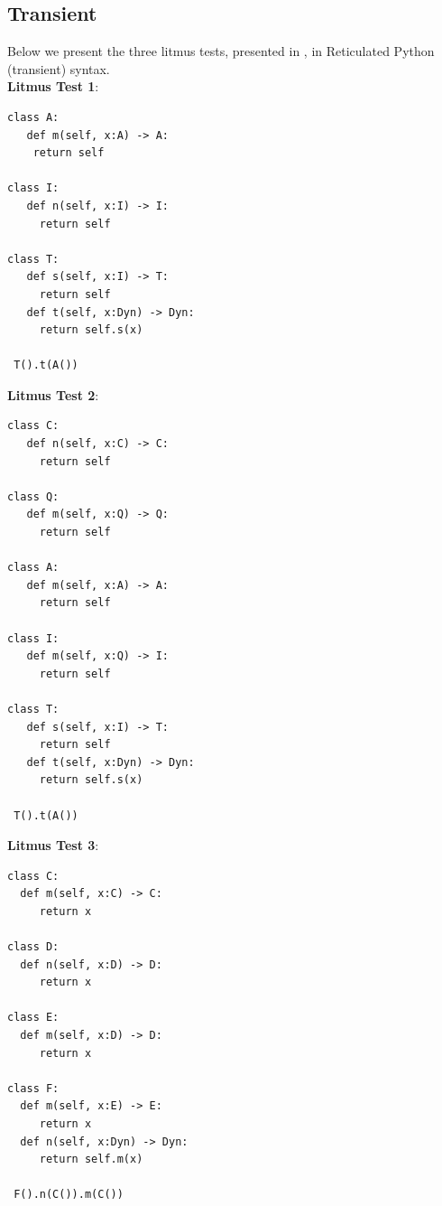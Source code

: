 \documentclass[acmlarge, anonymous, authordraft, review]{acmart} %
\begin{document}
\subsection*{Transient}

Below we present the three litmus tests, presented in , in Reticulated Python (transient) syntax. \\

\noindent
\textbf{Litmus Test 1}:
\begin{lstlisting}
class A:
   def m(self, x:A) -> A:
    return self
    
class I:
   def n(self, x:I) -> I:
     return self

class T:
   def s(self, x:I) -> T:
     return self
   def t(self, x:Dyn) -> Dyn:
     return self.s(x)

 T().t(A())
\end{lstlisting}

\noindent
\textbf{Litmus Test 2}:
\begin{lstlisting}
class C:
   def n(self, x:C) -> C:
     return self

class Q:
   def m(self, x:Q) -> Q:
     return self     
     
class A:
   def m(self, x:A) -> A:
     return self

class I:
   def m(self, x:Q) -> I:
     return self

class T:
   def s(self, x:I) -> T:
     return self
   def t(self, x:Dyn) -> Dyn:
     return self.s(x)

 T().t(A())
\end{lstlisting}


\noindent
\textbf{Litmus Test 3}:
\begin{lstlisting}
class C:
  def m(self, x:C) -> C:
     return x
     
class D:
  def n(self, x:D) -> D:
     return x
     
class E:
  def m(self, x:D) -> D:
     return x
     
class F:
  def m(self, x:E) -> E:
     return x   
  def n(self, x:Dyn) -> Dyn:
     return self.m(x)

 F().n(C()).m(C())
\end{lstlisting}
\end{document}
